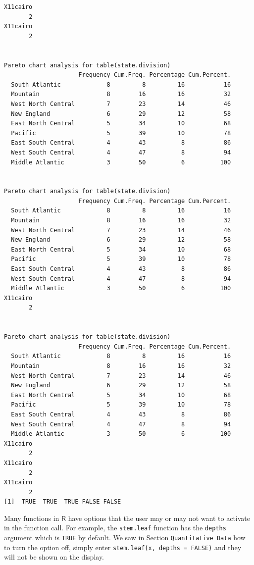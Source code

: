 \documentclass[10pt,english]{scrbook}
\begin{document}
\begin{verbatim}
X11cairo 
       2
X11cairo 
       2
 
                   
Pareto chart analysis for table(state.division)
                     Frequency Cum.Freq. Percentage Cum.Percent.
  South Atlantic             8         8         16           16
  Mountain                   8        16         16           32
  West North Central         7        23         14           46
  New England                6        29         12           58
  East North Central         5        34         10           68
  Pacific                    5        39         10           78
  East South Central         4        43          8           86
  West South Central         4        47          8           94
  Middle Atlantic            3        50          6          100
 
                   
Pareto chart analysis for table(state.division)
                     Frequency Cum.Freq. Percentage Cum.Percent.
  South Atlantic             8         8         16           16
  Mountain                   8        16         16           32
  West North Central         7        23         14           46
  New England                6        29         12           58
  East North Central         5        34         10           68
  Pacific                    5        39         10           78
  East South Central         4        43          8           86
  West South Central         4        47          8           94
  Middle Atlantic            3        50          6          100
X11cairo 
       2
 
                   
Pareto chart analysis for table(state.division)
                     Frequency Cum.Freq. Percentage Cum.Percent.
  South Atlantic             8         8         16           16
  Mountain                   8        16         16           32
  West North Central         7        23         14           46
  New England                6        29         12           58
  East North Central         5        34         10           68
  Pacific                    5        39         10           78
  East South Central         4        43          8           86
  West South Central         4        47          8           94
  Middle Atlantic            3        50          6          100
X11cairo 
       2
X11cairo 
       2
X11cairo 
       2
[1]  TRUE  TRUE  TRUE FALSE FALSE
\end{verbatim}

Many functions in \(\mathsf{R}\) have options that the user may or may not want to activate in the function call. For example, the \texttt{stem.leaf} function has the \texttt{depths} argument which is \texttt{TRUE} by default. We saw in Section \texttt{Quantitative Data} how to turn the option off, simply enter \texttt{stem.leaf(x, depths = FALSE)} and they will not be shown on the display.
\end{document}
